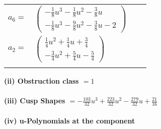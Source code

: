 \documentclass[1p]{elsarticle_modified}
\theoremstyle{definition}
\begin{document}
\begin{tabular}{m{7pt} m{180pt} m{7pt} m{180pt} }
\flushright $a_{6}=$&$\begin{pmatrix}-\frac{1}{8} u^3-\frac{1}{8} u^2-\frac{3}{8} u\\-\frac{1}{8} u^3-\frac{9}{8} u^2-\frac{3}{8} u-2\end{pmatrix}$ \\
\flushright $a_{2}=$&$\begin{pmatrix}\frac{1}{4} u^2+\frac{1}{4} u+\frac{3}{4}\\-\frac{3}{4} u^2+\frac{5}{4} u-\frac{5}{4}\end{pmatrix}$\\&\end{tabular}
\flushleft \textbf{(ii) Obstruction class $= 1$}\\~\\
\flushleft \textbf{(iii) Cusp Shapes $= -\frac{103}{32} u^3+\frac{223}{32} u^2-\frac{279}{32} u+\frac{21}{16}$}\\~\\
\newpage\renewcommand{\arraystretch}{1}
\flushleft \textbf{(iv) u-Polynomials at the component}\newline \\
\end{document}
